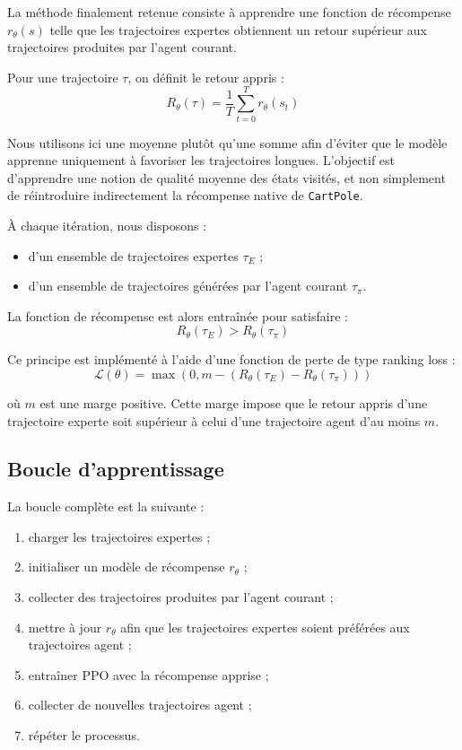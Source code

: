 La méthode finalement retenue consiste à apprendre une fonction de récompense \(r_\theta(s)\) telle que les trajectoires expertes obtiennent un retour supérieur aux trajectoires produites par l’agent courant.

Pour une trajectoire \(\tau\), on définit le retour appris :
\[
R_\theta(\tau) = \frac{1}{T}\sum_{t=0}^{T} r_\theta(s_t)
\]

Nous utilisons ici une moyenne plutôt qu’une somme afin d’éviter que le modèle apprenne uniquement à favoriser les trajectoires longues. L’objectif est d’apprendre une notion de qualité moyenne des états visités, et non simplement de réintroduire indirectement la récompense native de \texttt{CartPole}.

À chaque itération, nous disposons :
\begin{itemize}
    \item d’un ensemble de trajectoires expertes \(\tau_E\) ;
    \item d’un ensemble de trajectoires générées par l’agent courant \(\tau_\pi\).
\end{itemize}

La fonction de récompense est alors entraînée pour satisfaire :
\[
R_\theta(\tau_E) > R_\theta(\tau_\pi)
\]

Ce principe est implémenté à l’aide d’une fonction de perte de type ranking loss :
\[
\mathcal{L}(\theta)
=
\max\left(0, m - \left(R_\theta(\tau_E)-R_\theta(\tau_\pi)\right)\right)
\]

où \(m\) est une marge positive. Cette marge impose que le retour appris d’une trajectoire experte soit supérieur à celui d’une trajectoire agent d’au moins \(m\).

\subsection{Boucle d’apprentissage}

La boucle complète est la suivante :
\begin{enumerate}
    \item charger les trajectoires expertes ;
    \item initialiser un modèle de récompense \(r_\theta\) ;
    \item collecter des trajectoires produites par l’agent courant ;
    \item mettre à jour \(r_\theta\) afin que les trajectoires expertes soient préférées aux trajectoires agent ;
    \item entraîner PPO avec la récompense apprise ;
    \item collecter de nouvelles trajectoires agent ;
    \item répéter le processus.
\end{enumerate}


